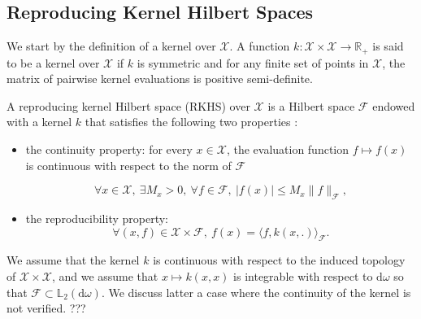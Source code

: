 \documentclass[twoside,11pt]{book}
\DeclareMathOperator{\Span}{\mathrm{Span}}
\begin{document}
\subsection{Reproducing Kernel Hilbert Spaces}\label{subsec:rkhs}

We start by the definition of a kernel over $\mathcal{X}$. A function $k: \mathcal{X} \times \mathcal{X} \rightarrow \mathbb{R}_{+}$ is said to be a kernel over $\mathcal{X}$ if $k$ is symmetric and for any finite set of points in $\mathcal{X}$, the matrix of pairwise kernel evaluations is positive semi-definite.

A reproducing kernel Hilbert space (RKHS) over $\mathcal{X}$ is a Hilbert space $\mathcal{F}$ endowed with a kernel $k$ that satisfies the following two properties \cite{BeTh11}: 
\begin{itemize}
\item the continuity property: for every $x \in \mathcal{X}$, the evaluation function $f \mapsto f(x)$ is continuous with respect to the norm of $\mathcal{F}$ 

\begin{equation}
\forall x \in \mathcal{X}, \: \exists M_{x} >0 , \: \forall f \in \mathcal{F}, \: |f(x)| \leq M_{x} \|f\|_{\mathcal{F}},\nonumber
\end{equation} 
\item the reproducibility property:\begin{equation}
\forall (x,f) \in \mathcal{X}\times\mathcal{F}, \: f(x) = \langle f, k(x,.) \rangle_{\mathcal{F}}. \nonumber
\end{equation}
\end{itemize}
 
We assume that the kernel $k$ is continuous with respect to the induced topology of $\mathcal{X} \times \mathcal{X}$, and we assume that $x \mapsto k(x,x)$ is integrable with respect to $\mathrm{d}\omega$ so that $\mathcal{F} \subset \mathbb{L}_{2}(\mathrm{d}\omega)$.
We discuss latter a case where the continuity of the kernel is not verified. ???



%
 
\end{document}
